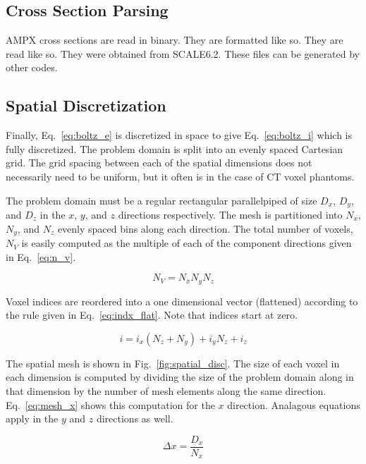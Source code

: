 \subsection{Cross Section Parsing}
AMPX cross sections are read in binary. They are formatted like so. They are read like so. They were obtained from SCALE6.2. These files can be generated by other codes.

\subsection{Spatial Discretization}

Finally, Eq.~\ref{eq:boltz_e} is discretized in space to give Eq.~\ref{eq:boltz_i} which is fully discretized. The problem domain is split into an evenly spaced Cartesian grid. The grid spacing between each of the spatial dimensions does not necessarily need to be uniform, but it often is in the case of CT voxel phantoms.

The problem domain must be a regular rectangular parallelpiped of size $D_x$, $D_y$, and $D_z$ in the $x$, $y$, and $z$ directions respectively. The mesh is partitioned into $N_x$, $N_y$, and $N_z$ evenly spaced bins along each direction. The total number of voxels, $N_V$ is easily computed as the multiple of each of the component directions given in Eq.~\ref{eq:n_v}.

\begin{equation} \label{eq:n_v}
	N_V = N_x N_y N_z
\end{equation}

Voxel indices are reordered into a one dimensional vector (flattened) according to the rule given in Eq.~\ref{eq:indx_flat}. Note that indices start at zero.

\begin{equation} \label{eq:indx_flat}
	i = i_x (N_z + N_y) + i_y N_z + i_z
\end{equation}

The spatial mesh is shown in Fig.~\ref{fig:spatial_disc}. The size of each voxel in each dimension is computed by dividing the size of the problem domain along in that dimension by the number of mesh elements along the same direction. Eq.~\ref{eq:mesh_x} shows this computation for the $x$ direction. Analagous equations apply in the $y$ and $z$ directions as well.

\begin{equation} \label{eq:mesh_x}
\Delta x = \frac{D_x}{N_x}
\end{equation}

